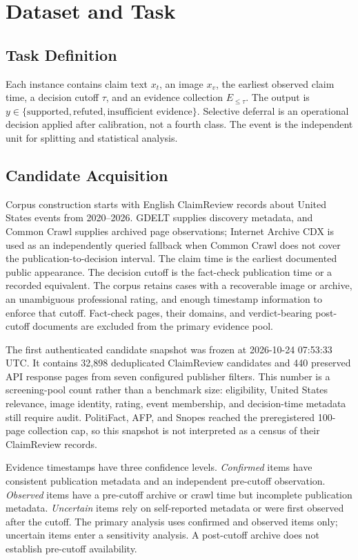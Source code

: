 \section{Dataset and Task}

\subsection{Task Definition}

Each instance contains claim text $x_t$, an image $x_v$, the earliest observed claim time, a decision cutoff $\tau$, and an evidence collection $E_{\leq\tau}$. The output is $y \in \{\text{supported},\text{refuted},\text{insufficient evidence}\}$. Selective deferral is an operational decision applied after calibration, not a fourth class. The event is the independent unit for splitting and statistical analysis.

\subsection{Candidate Acquisition}

Corpus construction starts with English ClaimReview records about United States events from 2020--2026. GDELT supplies discovery metadata, and Common Crawl supplies archived page observations; Internet Archive CDX is used as an independently queried fallback when Common Crawl does not cover the publication-to-decision interval. The claim time is the earliest documented public appearance. The decision cutoff is the fact-check publication time or a recorded equivalent. The corpus retains cases with a recoverable image or archive, an unambiguous professional rating, and enough timestamp information to enforce that cutoff. Fact-check pages, their domains, and verdict-bearing post-cutoff documents are excluded from the primary evidence pool.

The first authenticated candidate snapshot was frozen at 2026-10-24 07:53:33 UTC. It contains 32,898 deduplicated ClaimReview candidates and 440 preserved API response pages from seven configured publisher filters. This number is a screening-pool count rather than a benchmark size: eligibility, United States relevance, image identity, rating, event membership, and decision-time metadata still require audit. PolitiFact, AFP, and Snopes reached the preregistered 100-page collection cap, so this snapshot is not interpreted as a census of their ClaimReview records.

Evidence timestamps have three confidence levels. \emph{Confirmed} items have consistent publication metadata and an independent pre-cutoff observation. \emph{Observed} items have a pre-cutoff archive or crawl time but incomplete publication metadata. \emph{Uncertain} items rely on self-reported metadata or were first observed after the cutoff. The primary analysis uses confirmed and observed items only; uncertain items enter a sensitivity analysis. A post-cutoff archive does not establish pre-cutoff availability.

